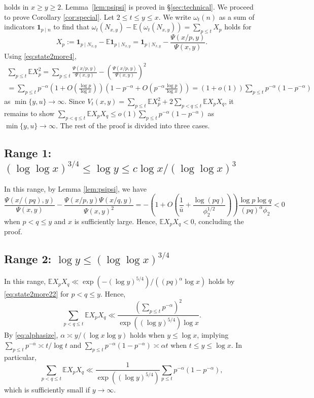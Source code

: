 \documentclass{amsart}
\theoremstyle{plain}
\theoremstyle{remark}
\newcommand{\EE}{\mathbb{E}}
\newcommand{\ubar}{\bar{u}}
\begin{document}
holds in $x \ge y \ge 2$. Lemma~\ref{lem:psipsi} is proved in \S\ref{sec:technical}. We proceed to prove Corollary \ref{cor:special}. Let $2\le t \le y \le x$. We write $\omega_t(n)$ as a sum of indicators $\mathbf{1}_{p \mid n}$ to find that
	$\omega_t(N_{x,y}) - \EE(\omega_t(N_{x,y}))=\sum_{p\le t} X_p$ holds for 
	\[ X_p :=  \mathbf{1}_{p \mid N_{x,y}} - \EE \mathbf{1}_{p \mid N_{x,y}} = \mathbf{1}_{p \mid N_{x,y}} - \frac{\Psi(x/p,y)}{\Psi(x,y)}.\]
	Using \eqref{eq:state2more4},
	\begin{multline*}
	\sum_{p\le t}	\EE X_p^2 = \sum_{p\le t} \frac{\Psi(x/p,y)}{\Psi(x,y)} - \left(\frac{\Psi(x/p,y)}{\Psi(x,y)}\right)^2\\
		= \sum_{p \le t} p^{-\alpha} \left( 1 + O\left(\frac{\log p}{\log x}\right)\right) \left( 1 - p^{-\alpha} + O\left( p^{-\alpha} \frac{\log p}{\log x} \right)\right)= (1+o(1))\sum_{p \le t} p^{-\alpha}(1-p^{-\alpha})
	\end{multline*}
	as $\min\{y,u\}\to \infty$. Since $V_t(x,y) = \sum_{p \le t} \EE X_p^2 + 2 \sum_{p < q \le t} \EE X_p X_q$, it remains to show $\sum_{p < q \le t} \EE X_p X_q \le o(1)\sum_{p\le t}p^{-\alpha}(1-p^{-\alpha})$ as $\min\{y,u\} \to \infty$. The rest of the proof is divided into three cases.
	\subsection{Range 1: $(\log \log x)^{3/4} \le \log y \le c\log x/(\log \log x)^3$}
	In this range, by Lemma \ref{lem:psipsi}, we have
		\[ \frac{\Psi(x/(pq),y)}{\Psi(x,y)} -\frac{\Psi(x/p,y)\Psi(x/q,y)}{\Psi(x,y)^2} = -\left( 1+ O\left(\frac{1}{\ubar} + \frac{\log (pq)}{\phi_2^{1/2}} \right)\right) \frac{\log p \log q}{ (pq)^{\alpha}\phi_2}< 0\]
		when $p <q \le y$ and $x$ is sufficiently large. Hence, $\EE X_p X_q < 0$, concluding the proof.
		\subsection{Range 2: $\log y \le (\log \log x)^{3/4}$}
		In this range,
		$\EE X_p X_q \ll \exp(-(\log y)^{5/4})/((pq)^{\alpha}\log x)$ holds by \eqref{eq:state2more22} for $p<q \le y$.  Hence,
		\[ \sum_{p <q \le t} \EE X_p X_q \ll  \frac{( \sum_{p \le t} p^{-\alpha})^2}{ \exp((\log y)^{5/4})\log x}. \]
		By \eqref{eq:alphasize}, $\alpha \asymp y/(\log x \log y)$ holds when $y  \le \log x$, implying $\sum_{p \le t}p^{-\alpha} \asymp t/\log t$ and $\sum_{p \le t}p^{-\alpha}(1-p^{-\alpha}) \asymp \alpha t$ when $t \le y \le \log x$. In particular,
		\[ \sum_{p <q \le t} \EE X_p X_q \ll \frac{1}{\exp((\log y)^{5/4})} \sum_{p \le t}p^{-\alpha}(1-p^{-\alpha}),  \]
which is sufficiently small if $y\to \infty$.
\end{document}
